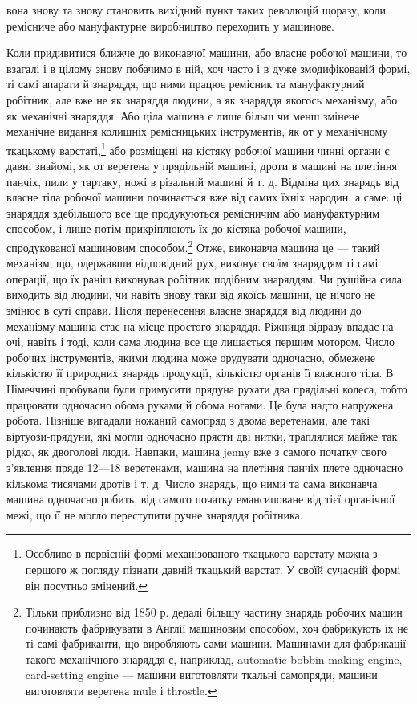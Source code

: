 вона знову та знову становить вихідний пункт таких революцій
щоразу, коли ремісниче або мануфактурне виробництво переходить
у машинове.

Коли придивитися ближче до виконавчої машини, або власне
робочої машини, то взагалі і в цілому знову побачимо в ній, хоч
часто і в дуже змодифікованій формі, ті самі апарати й знаряддя,
що ними працює ремісник та мануфактурний робітник, але
вже не як знаряддя людини, а як знаряддя якогось механізму,
або як механічні знаряддя. Або ціла машина є лише більш
чи менш змінене механічне видання колишніх ремісницьких
інструментів, як от у механічному ткацькому варстаті,\footnote{
Особливо в первісній формі механізованого ткацького варстату
можна з першого ж погляду пізнати давній ткацький варстат. У своїй
сучасній формі він посутньо змінений.
} або
розміщені на кістяку робочої машини чинні органи є давні
знайомі, як от веретена у прядільній машині, дроти в машині
на плетіння панчіх, пили у тартаку, ножі в різальній машині
й т. д. Відміна цих знарядь від власне тіла робочої машини
починається вже від самих їхніх народин, а саме: ці знаряддя
здебільшого все ще продукуються ремісничим або мануфактурним
способом, і лише потім прикріплюють їх до кістяка
робочої машини, спродукованої машиновим способом.\footnote{
Тільки приблизно від 1850 р. дедалі більшу частину знарядь робочих
машин починають фабрикувати в Англії машиновим способом, хоч
фабрикують їх не ті самі фабриканти, що виробляють сами машини.
Машинами для фабрикації такого механічного знаряддя є, наприклад,
automatic bobbin-making engine, card-setting engine — машини виготовляти
ткальні самопряди, машини виготовляти веретена mule і throstle.
} Отже,
виконавча машина це — такий механізм, що, одержавши відповідний
рух, виконує своїм знаряддям ті самі операції, що їх раніш
виконував робітник подібним знаряддям. Чи рушійна сила виходить
від людини, чи навіть знову таки від якоїсь машини, це
нічого не змінює в суті справи. Після перенесення власне знаряддя
від людини до механізму машина стає на місце простого знаряддя.
Ріжниця відразу впадає на очі, навіть і тоді, коли сама людина
все ще лишається першим мотором. Число робочих інструментів,
якими людина може орудувати одночасно, обмежене кількістю
її природних знарядь продукції, кількістю органів її власного
тіла. В Німеччині пробували були примусити прядуна рухати
два прядільні колеса, тобто працювати одночасно обома руками
й обома ногами. Це була надто напружена робота. Пізніше вигадали
ножаний самопряд з двома веретенами, але такі віртуози-прядуни,
які могли одночасно прясти дві нитки, траплялися майже
так рідко, як двоголові люди. Навпаки, машина jenny вже з
самого початку свого з’явлення пряде 12—18 веретенами, машина
на плетіння панчіх плете одночасно кількома тисячами дротів і
т. д. Число знарядь, що ними та сама виконавча машина одночасно
робить, від самого початку емансиповане від тієї органічної
межі, що її не могло переступити ручне знаряддя робітника.